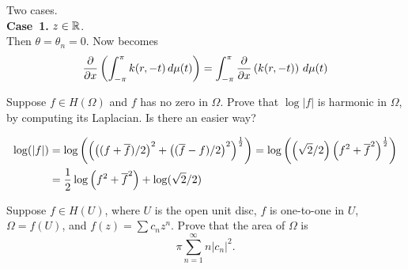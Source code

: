\begin{enumerate}

Two cases. \\
\textbf{Case~1.} \(z\in\mathbb{R}\). \\
Then \(\theta = \theta_n = 0\). Now  becomes
\begin{equation} \locallabel{eq:need:lim}
\frac{\partial}{\partial x}\left( \int_{-\pi}^\pi k(r, -t)\,d\mu(t)\right)
= 
\int_{-\pi}^\pi \frac{\partial}{\partial x}\left( k(r, -t)\right)\,d\mu(t)
\end{equation}
\fi

\iffalse
\textbf{Case~1.} \(z=0\). \\
Then \(r=0\), \(\theta = \theta_n = 0\), \(h_n = r_n\)
and \eqref{eq:11.4:need:limn} becomes
\begin{equation*}
\lim_{n\to\infty}\frac{1}{h_n}
  \left( \int_{-\pi}^\pi k(0)-k(h_n, -t)\bigr)\,d\mu(t)\right)
 =
\int_{-\pi}^\pi 
  \left( \lim_{n\to\infty}\frac{1}{h_n} \bigl(k(0)-k(h_n, -t)\bigr)  
  \right)  \,d\mu(t)
\end{equation*}

The ``directonal'' derivative
\begin{equation*}
 \lim_{n\to\infty}\frac{1}{h_n} \bigl(k(0)-k(h_n, -t)\bigr)
 = e^{i\Arg(t)}\cdot k'(0).
\end{equation*}

\textbf{Case~2.} \(z\neq 0\).
\fi

\unfinished

\begin{excopy}
Suppose \(f \in H(\Omega)\) and $f$ has no zero in \(\Omega\).
Prove that \(\log|f|\) is harmonic in \(\Omega\), by computing its
Laplacian. Is there an easier way?
\end{excopy}

\begin{align*}
\log(|f|)
 &= \log\left( \left(\left((f+\overline{f})/2\right)^2 
    + \left((\overline{f} - f)/2\right)^2\right)^{\frac{1}{2}}\right)
 = \log\left( \left(\sqrt{2}/2\right)\left(f^2 
    + {\overline{f}}^2\right)^{\frac{1}{2}}\right) \\
 &= \frac{1}{2} \log\left(f^2 + {\overline{f}}^2\right) + \log(\sqrt{2}/2)
\end{align*}

\unfinished

\begin{excopy}
Suppose \(f \in H(U)\), where $U$ is the open unit disc, $f$ is one-to-one in
$U$, \(\Omega = f(U)\), and \(f(z) = \sum c_n z^n\).
Prove that the area of \(\Omega\) is 
\begin{equation*}
\pi \sum_{n=1}^\infty n |c_n|^2.
\end{equation*}


\end{excopy}
\end{enumerate}
